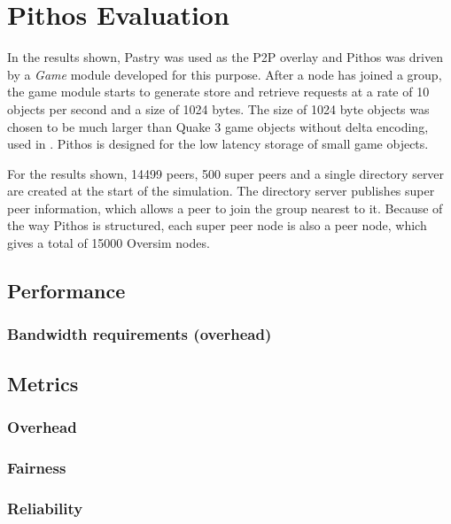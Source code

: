 \chapter{Pithos Evaluation}
    \label{chp:EVALUATION}

In the results shown, Pastry was used as the P2P overlay and Pithos was driven by a \emph{Game} module developed for this purpose. After a node has
joined a group, the game module starts to generate store and retrieve requests at a rate of 10 objects per second and a size of 1024 bytes. The size
of 1024 byte objects was chosen to be much larger than Quake 3 game objects without delta encoding, used in \cite{Bharambe_Donnybrook}. Pithos is
designed for the low latency storage of small game objects.

For the results shown, 14499 peers, 500 super peers and a single directory server are created at the start of the simulation. The directory server
publishes super peer information, which allows a peer to join the group nearest to it. Because of the way Pithos is structured, each super peer node is also a peer node, which gives a total of 15000 Oversim nodes.

    \section{Performance}

    \subsection{Bandwidth requirements (overhead)}

    \section{Metrics}
        \subsection{Overhead}
        \subsection{Fairness}
        \subsection{Reliability}
